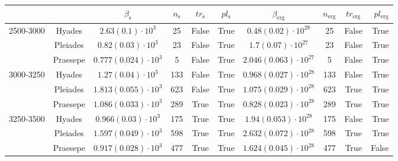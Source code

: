 \begin{tabular}{lccccccccr}
\hline
          &         &                     $\beta_\mathrm{s}$ & $n_\mathrm{s}$ & $tr_\mathrm{s}$ & $pl_\mathrm{s}$ &                        $\beta_\mathrm{erg}$ & $n_\mathrm{erg}$ & $tr_\mathrm{erg}$ & $pl_\mathrm{erg}$ \\
\hline
2500-3000 & Hyades &     $2.63\left(0.1\right)\cdot 10^{3}$ &             25 &           False &            True &        $0.48\left(0.02\right)\cdot 10^{28}$ &               25 &             False &              True \\
          & Pleiades &    $0.82\left(0.03\right)\cdot 10^{3}$ &             23 &           False &            True &         $1.7\left(0.07\right)\cdot 10^{27}$ &               23 &             False &              True \\
          & Praesepe &  $0.777\left(0.024\right)\cdot 10^{3}$ &              5 &           False &            True &      $2.046\left(0.063\right)\cdot 10^{27}$ &                5 &             False &              True \\
3000-3250 & Hyades &    $1.27\left(0.04\right)\cdot 10^{3}$ &            133 &           False &            True &      $0.968\left(0.027\right)\cdot 10^{28}$ &              133 &             False &              True \\
          & Pleiades &  $1.813\left(0.055\right)\cdot 10^{3}$ &            623 &           False &            True &      $1.075\left(0.029\right)\cdot 10^{28}$ &              623 &              True &              True \\
          & Praesepe &  $1.086\left(0.033\right)\cdot 10^{3}$ &            289 &            True &            True &      $0.828\left(0.023\right)\cdot 10^{28}$ &              289 &              True &              True \\
3250-3500 & Hyades &   $0.966\left(0.03\right)\cdot 10^{3}$ &            175 &            True &            True &       $1.94\left(0.053\right)\cdot 10^{28}$ &              175 &             False &              True \\
          & Pleiades &  $1.597\left(0.049\right)\cdot 10^{3}$ &            598 &            True &            True &      $2.632\left(0.072\right)\cdot 10^{28}$ &              598 &              True &              True \\
          & Praesepe &  $0.917\left(0.028\right)\cdot 10^{3}$ &            477 &            True &            True &      $1.624\left(0.045\right)\cdot 10^{28}$ &              477 &              True &             False \\

\end{tabular}
